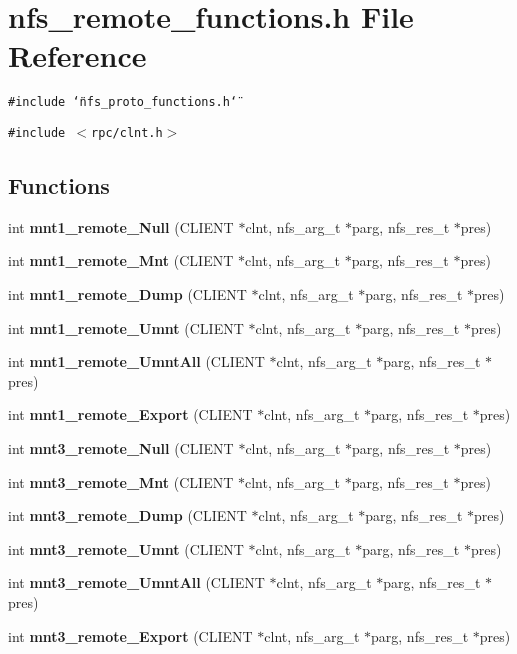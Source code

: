\section{nfs\_\-remote\_\-functions.h File Reference}
\label{nfs__remote__functions_8h}
{\tt \#include \char`\"{}nfs\_\-proto\_\-functions.h\char`\"{}}\par
{\tt \#include $<$rpc/clnt.h$>$}\par
\subsection*{Functions}
\begin{CompactItemize}
\item 
int {\bf mnt1\_\-remote\_\-Null} (CLIENT $\ast$clnt, nfs\_\-arg\_\-t $\ast$parg, nfs\_\-res\_\-t $\ast$pres)
\item 
int {\bf mnt1\_\-remote\_\-Mnt} (CLIENT $\ast$clnt, nfs\_\-arg\_\-t $\ast$parg, nfs\_\-res\_\-t $\ast$pres)
\item 
int {\bf mnt1\_\-remote\_\-Dump} (CLIENT $\ast$clnt, nfs\_\-arg\_\-t $\ast$parg, nfs\_\-res\_\-t $\ast$pres)
\item 
int {\bf mnt1\_\-remote\_\-Umnt} (CLIENT $\ast$clnt, nfs\_\-arg\_\-t $\ast$parg, nfs\_\-res\_\-t $\ast$pres)
\item 
int {\bf mnt1\_\-remote\_\-UmntAll} (CLIENT $\ast$clnt, nfs\_\-arg\_\-t $\ast$parg, nfs\_\-res\_\-t $\ast$pres)
\item 
int {\bf mnt1\_\-remote\_\-Export} (CLIENT $\ast$clnt, nfs\_\-arg\_\-t $\ast$parg, nfs\_\-res\_\-t $\ast$pres)
\item 
int {\bf mnt3\_\-remote\_\-Null} (CLIENT $\ast$clnt, nfs\_\-arg\_\-t $\ast$parg, nfs\_\-res\_\-t $\ast$pres)
\item 
int {\bf mnt3\_\-remote\_\-Mnt} (CLIENT $\ast$clnt, nfs\_\-arg\_\-t $\ast$parg, nfs\_\-res\_\-t $\ast$pres)
\item 
int {\bf mnt3\_\-remote\_\-Dump} (CLIENT $\ast$clnt, nfs\_\-arg\_\-t $\ast$parg, nfs\_\-res\_\-t $\ast$pres)
\item 
int {\bf mnt3\_\-remote\_\-Umnt} (CLIENT $\ast$clnt, nfs\_\-arg\_\-t $\ast$parg, nfs\_\-res\_\-t $\ast$pres)
\item 
int {\bf mnt3\_\-remote\_\-UmntAll} (CLIENT $\ast$clnt, nfs\_\-arg\_\-t $\ast$parg, nfs\_\-res\_\-t $\ast$pres)
\item 
int {\bf mnt3\_\-remote\_\-Export} (CLIENT $\ast$clnt, nfs\_\-arg\_\-t $\ast$parg, nfs\_\-res\_\-t $\ast$pres)

\end{CompactItemize}
